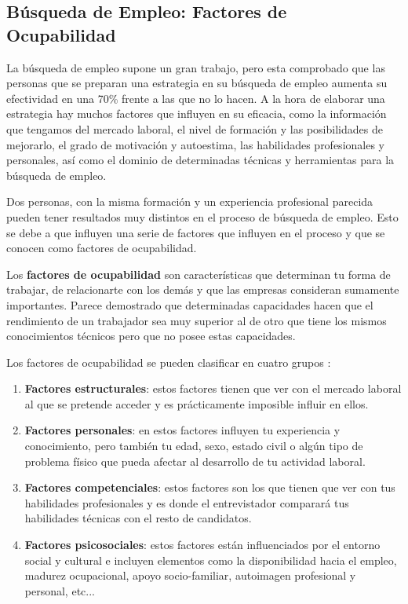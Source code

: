 \subsection{Búsqueda de Empleo: Factores de Ocupabilidad}
La búsqueda de empleo supone un gran trabajo, pero esta comprobado que las personas que se preparan una estrategia en su búsqueda de empleo aumenta su efectividad en una 70\% frente a las que no lo hacen. A la hora de elaborar una estrategia hay muchos factores que influyen en su eficacia, como la información que tengamos del mercado laboral, el nivel de formación y las posibilidades de mejorarlo, el grado de motivación y autoestima, las habilidades profesionales y personales, así como el dominio de determinadas técnicas y herramientas para la búsqueda de empleo.

Dos personas, con la misma formación y un experiencia profesional parecida pueden tener resultados muy distintos en el proceso de búsqueda de empleo. Esto se debe a que influyen una serie de factores que influyen en el proceso y que se conocen como factores de ocupabilidad.

Los \textbf{factores de ocupabilidad} son características que determinan tu forma de trabajar, de relacionarte con los demás y que las empresas consideran sumamente importantes. Parece demostrado que determinadas capacidades hacen que el rendimiento de un trabajador sea muy superior al de otro que tiene los mismos conocimientos técnicos pero que no posee estas capacidades.

Los factores de ocupabilidad se pueden clasificar en cuatro grupos \cite{trabyper}:

\begin{enumerate}
    \item \textbf{Factores estructurales}: estos factores tienen que ver con el mercado laboral al que se pretende acceder y es prácticamente imposible influir en ellos.
    \item \textbf{Factores personales}: en estos factores influyen tu experiencia y conocimiento, pero también tu edad, sexo, estado civil o algún tipo de problema físico que pueda afectar al desarrollo de tu actividad laboral.
    \item \textbf{Factores competenciales}: estos factores son los que tienen que ver con tus habilidades profesionales y es donde el entrevistador comparará tus habilidades técnicas con el resto de candidatos.
    \item \textbf{Factores psicosociales}: estos factores están influenciados por el entorno social y cultural e incluyen elementos como la disponibilidad hacia el empleo, madurez ocupacional, apoyo socio-familiar, autoimagen profesional y personal, etc...
\end{enumerate}

